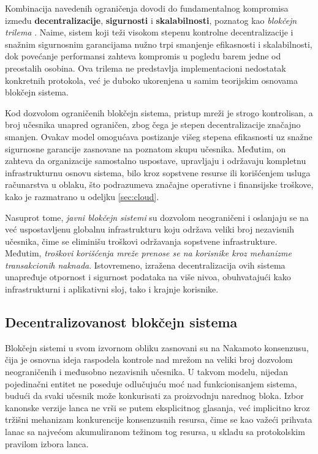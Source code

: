 Kombinacija navedenih ograničenja dovodi do fundamentalnog kompromisa između \textbf{decentralizacije}, \textbf{sigurnosti} i \textbf{skalabilnosti}, poznatog kao \textit{blokčejn trilema} \cite{werth2023review}. Naime, sistem koji teži visokom stepenu kontrolne decentralizacije i snažnim sigurnosnim garancijama nužno trpi smanjenje efikasnosti i skalabilnosti, dok povećanje performansi zahteva kompromis u pogledu barem jedne od preostalih osobina. Ova trilema ne predstavlja implementacioni nedostatak konkretnih protokola, već je duboko ukorenjena u samim teorijskim osnovama blokčejn sistema.

Kod dozvolom ograničenih blokčejn sistema, pristup mreži je strogo kontrolisan, a broj učesnika unapred ograničen, zbog čega je stepen decentralizacije značajno smanjen. Ovakav model omogućava postizanje višeg stepena efikasnosti uz snažne sigurnosne garancije zasnovane na poznatom skupu učesnika. Međutim, on zahteva da organizacije samostalno uspostave, upravljaju i održavaju kompletnu infrastrukturnu osnovu sistema, bilo kroz sopstvene resurse ili korišćenjem usluga računarstva u oblaku, što podrazumeva značajne operativne i finansijske troškove, kako je razmatrano u odeljku \ref{sec:cloud}.

Nasuprot tome, \textit{javni blokčejn sistemi} su dozvolom neograničeni i oslanjaju se na već uspostavljenu globalnu infrastrukturu koju održava veliki broj nezavisnih učesnika, čime se eliminišu troškovi održavanja sopstvene infrastrukture. Međutim, \textit{troškovi korišćenja mreže prenose se na korisnike kroz mehanizme transakcionih naknada}. Istovremeno, izražena decentralizacija ovih sistema unapređuje otpornost i sigurnost podataka na više nivoa, obuhvatajući kako infrastrukturni i aplikativni sloj, tako i krajnje korisnike.

\subsection{Decentralizovanost blokčejn sistema}
Blokčejn sistemi u svom izvornom obliku zasnovani su na Nakamoto konsenzusu, čija je osnovna ideja raspodela kontrole nad mrežom na veliki broj dozvolom neograničenih i međusobno nezavisnih učesnika. U takvom modelu, nijedan pojedinačni entitet ne poseduje odlučujuću moć nad funkcionisanjem sistema, budući da svaki učesnik može konkurisati za proizvodnju narednog bloka. Izbor kanonske verzije lanca ne vrši se putem eksplicitnog glasanja, već implicitno kroz tržišni mehanizam konkurencije konsenzusnih resursa, čime se kao važeći prihvata lanac sa najvećom akumuliranom težinom tog resursa, u skladu sa protokolskim pravilom izbora lanca.

